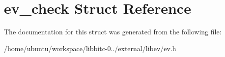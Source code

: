 \hypertarget{structev__check}{\section{ev\-\_\-check Struct Reference}
\label{structev__check}
}


The documentation for this struct was generated from the following file\-:\begin{DoxyCompactItemize}
\item 
/home/ubuntu/workspace/libbitc-\/0../external/libev/ev.\-h\end{DoxyCompactItemize}
